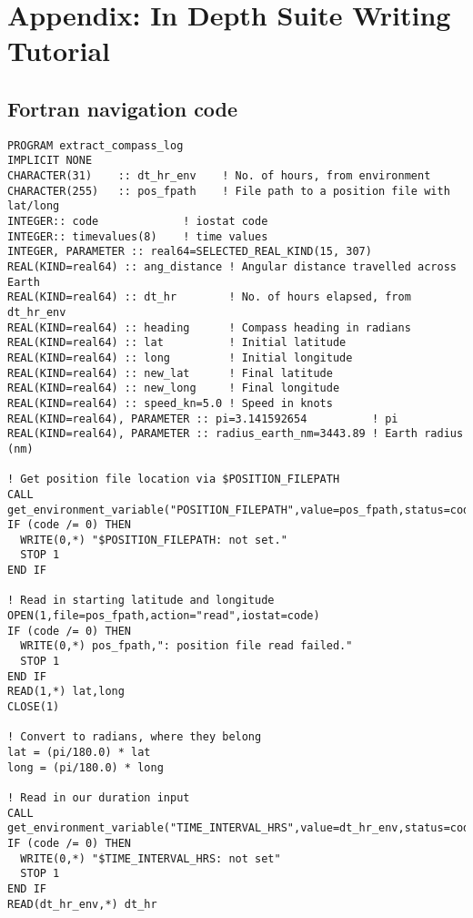 \section{Appendix: In Depth Suite Writing Tutorial}
\label{Appendix In Depth Suite Writing Tutorial}


\subsection{Fortran navigation code}

\lstset{language=Fortran}
\begin{lstlisting}[columns=fullflexible,basicstyle=\small]
PROGRAM extract_compass_log
IMPLICIT NONE
CHARACTER(31)    :: dt_hr_env    ! No. of hours, from environment
CHARACTER(255)   :: pos_fpath    ! File path to a position file with lat/long
INTEGER:: code             ! iostat code
INTEGER:: timevalues(8)    ! time values
INTEGER, PARAMETER :: real64=SELECTED_REAL_KIND(15, 307)
REAL(KIND=real64) :: ang_distance ! Angular distance travelled across Earth
REAL(KIND=real64) :: dt_hr        ! No. of hours elapsed, from dt_hr_env
REAL(KIND=real64) :: heading      ! Compass heading in radians
REAL(KIND=real64) :: lat          ! Initial latitude
REAL(KIND=real64) :: long         ! Initial longitude
REAL(KIND=real64) :: new_lat      ! Final latitude
REAL(KIND=real64) :: new_long     ! Final longitude
REAL(KIND=real64) :: speed_kn=5.0 ! Speed in knots
REAL(KIND=real64), PARAMETER :: pi=3.141592654          ! pi
REAL(KIND=real64), PARAMETER :: radius_earth_nm=3443.89 ! Earth radius (nm)

! Get position file location via $POSITION_FILEPATH
CALL get_environment_variable("POSITION_FILEPATH",value=pos_fpath,status=code)
IF (code /= 0) THEN
  WRITE(0,*) "$POSITION_FILEPATH: not set."
  STOP 1
END IF

! Read in starting latitude and longitude
OPEN(1,file=pos_fpath,action="read",iostat=code)
IF (code /= 0) THEN
  WRITE(0,*) pos_fpath,": position file read failed."
  STOP 1
END IF
READ(1,*) lat,long
CLOSE(1)

! Convert to radians, where they belong
lat = (pi/180.0) * lat
long = (pi/180.0) * long

! Read in our duration input
CALL get_environment_variable("TIME_INTERVAL_HRS",value=dt_hr_env,status=code)
IF (code /= 0) THEN
  WRITE(0,*) "$TIME_INTERVAL_HRS: not set"
  STOP 1
END IF
READ(dt_hr_env,*) dt_hr


\end{lstlisting}
